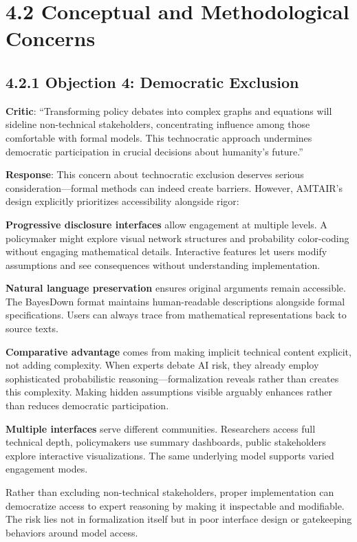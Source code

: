 \documentclass[
  11pt,
  letterpaper,
  openany]{book}
\begin{document}
\section{4.2 Conceptual and Methodological
Concerns}\label{sec-conceptual-concerns}

\subsection{4.2.1 Objection 4: Democratic
Exclusion}\label{sec-democratic-exclusion}

\textbf{Critic}: ``Transforming policy debates into complex graphs and
equations will sideline non-technical stakeholders, concentrating
influence among those comfortable with formal models. This technocratic
approach undermines democratic participation in crucial decisions about
humanity's future.''

\textbf{Response}: This concern about technocratic exclusion deserves
serious consideration---formal methods can indeed create barriers.
However, AMTAIR's design explicitly prioritizes accessibility alongside
rigor:

\textbf{Progressive disclosure interfaces} allow engagement at multiple
levels. A policymaker might explore visual network structures and
probability color-coding without engaging mathematical details.
Interactive features let users modify assumptions and see consequences
without understanding implementation.

\textbf{Natural language preservation} ensures original arguments remain
accessible. The BayesDown format maintains human-readable descriptions
alongside formal specifications. Users can always trace from
mathematical representations back to source texts.

\textbf{Comparative advantage} comes from making implicit technical
content explicit, not adding complexity. When experts debate AI risk,
they already employ sophisticated probabilistic
reasoning---formalization reveals rather than creates this complexity.
Making hidden assumptions visible arguably enhances rather than reduces
democratic participation.

\textbf{Multiple interfaces} serve different communities. Researchers
access full technical depth, policymakers use summary dashboards, public
stakeholders explore interactive visualizations. The same underlying
model supports varied engagement modes.

Rather than excluding non-technical stakeholders, proper implementation
can democratize access to expert reasoning by making it inspectable and
modifiable. The risk lies not in formalization itself but in poor
interface design or gatekeeping behaviors around model access.
\end{document}
